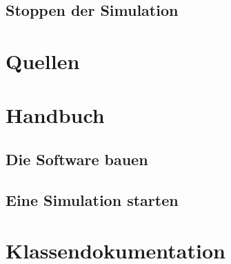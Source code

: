 \documentclass[14pt, a4paper]{report}
\begin{document}
\section{Stoppen der Simulation}

\chapter{Quellen}

\appendix
\chapter{Handbuch}
\tableofcontents
\section{Die Software bauen}
\section{Eine Simulation starten}


\chapter{Klassendokumentation}
\newpage
\end{document}
